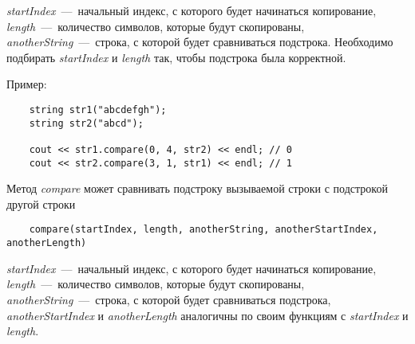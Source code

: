 \textit{startIndex}~---~начальный индекс, с которого будет начинаться копирование, \textit{length}~---~количество символов, которые будут скопированы, \textit{anotherString}~---~строка, с которой будет сравниваться подстрока. Необходимо подбирать \textit{startIndex} и \textit{length} так, чтобы подстрока была корректной.

Пример:

\begin{lstlisting}
    string str1("abcdefgh");
    string str2("abcd");

    cout << str1.compare(0, 4, str2) << endl; // 0
    cout << str2.compare(3, 1, str1) << endl; // 1
\end{lstlisting}

Метод \textit{compare} может сравнивать подстроку вызываемой строки с подстрокой другой строки
\begin{lstlisting}
    compare(startIndex, length, anotherString, anotherStartIndex, anotherLength)
\end{lstlisting}

\textit{startIndex}~---~начальный индекс, с которого будет начинаться копирование, \textit{length}~---~количество символов, которые будут скопированы, \textit{anotherString}~---~строка, с которой будет сравниваться подстрока, \textit{anotherStartIndex} и \textit{anotherLength} аналогичны по своим функциям с \textit{startIndex} и \textit{length}.